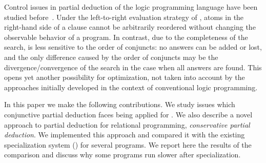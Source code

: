 Control issues in partial deduction of the logic programming language \pro have been studied before~\cite{leuschel2002logic}.
Under the left-to-right evaluation strategy of \pro, atoms in the right-hand side of a clause cannot be arbitrarily reordered without changing the observable behavior of a program.
In contrast, due to the completeness of the search, \mk is less sensitive to the order of conjuncts: no answers can be added or lost, and the only difference caused by the order of conjuncts may be the divergence/convergence of the search in the case when all answers are found.
This opens yet another possibility for optimization, not taken into account by the approaches initially developed in the context of conventional logic programming.

In this paper we make the following contributions.
We study issues which conjunctive partial deduction faces being applied for \mk.
We also describe a novel approach to partial deduction for relational programming, \emph{conservative partial deduction}.
We implemented this approach and compared it with the existing specialization system (\ecce) for several programs.
We report here the results of the comparison and discuss why some \mk programs run slower after specialization.
